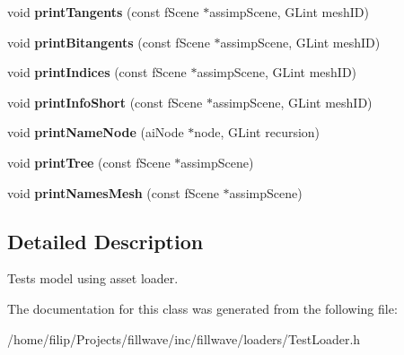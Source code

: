 \begin{DoxyCompactItemize}
\item 
\hypertarget{classfillwave_1_1loader_1_1TestLoader_ae180f645f86affce45a80ff8247a3a14}{}void {\bfseries print\+Tangents} (const f\+Scene $\ast$assimp\+Scene, G\+Lint mesh\+I\+D)\label{classfillwave_1_1loader_1_1TestLoader_ae180f645f86affce45a80ff8247a3a14}

\item 
\hypertarget{classfillwave_1_1loader_1_1TestLoader_af66016544be588ea0d97d75609302216}{}void {\bfseries print\+Bitangents} (const f\+Scene $\ast$assimp\+Scene, G\+Lint mesh\+I\+D)\label{classfillwave_1_1loader_1_1TestLoader_af66016544be588ea0d97d75609302216}

\item 
\hypertarget{classfillwave_1_1loader_1_1TestLoader_ae31af8b0470c9a551f86844cc8aee678}{}void {\bfseries print\+Indices} (const f\+Scene $\ast$assimp\+Scene, G\+Lint mesh\+I\+D)\label{classfillwave_1_1loader_1_1TestLoader_ae31af8b0470c9a551f86844cc8aee678}

\item 
\hypertarget{classfillwave_1_1loader_1_1TestLoader_a0679a31c89fb06ecb2d02f2c8bb2ce9a}{}void {\bfseries print\+Info\+Short} (const f\+Scene $\ast$assimp\+Scene, G\+Lint mesh\+I\+D)\label{classfillwave_1_1loader_1_1TestLoader_a0679a31c89fb06ecb2d02f2c8bb2ce9a}

\item 
\hypertarget{classfillwave_1_1loader_1_1TestLoader_a5f442f3b7e8b6ad9ddec4624fc019946}{}void {\bfseries print\+Name\+Node} (ai\+Node $\ast$node, G\+Lint recursion)\label{classfillwave_1_1loader_1_1TestLoader_a5f442f3b7e8b6ad9ddec4624fc019946}

\item 
\hypertarget{classfillwave_1_1loader_1_1TestLoader_af029cf84561dca535cbc2c1d7781eea7}{}void {\bfseries print\+Tree} (const f\+Scene $\ast$assimp\+Scene)\label{classfillwave_1_1loader_1_1TestLoader_af029cf84561dca535cbc2c1d7781eea7}

\item 
\hypertarget{classfillwave_1_1loader_1_1TestLoader_a151a68d5cd62c68929345a80a9f1e2fc}{}void {\bfseries print\+Names\+Mesh} (const f\+Scene $\ast$assimp\+Scene)\label{classfillwave_1_1loader_1_1TestLoader_a151a68d5cd62c68929345a80a9f1e2fc}

\end{DoxyCompactItemize}


\subsection{Detailed Description}
Tests model using asset loader. 

The documentation for this class was generated from the following file\+:\begin{DoxyCompactItemize}
\item 
/home/filip/\+Projects/fillwave/inc/fillwave/loaders/Test\+Loader.\+h\end{DoxyCompactItemize}
